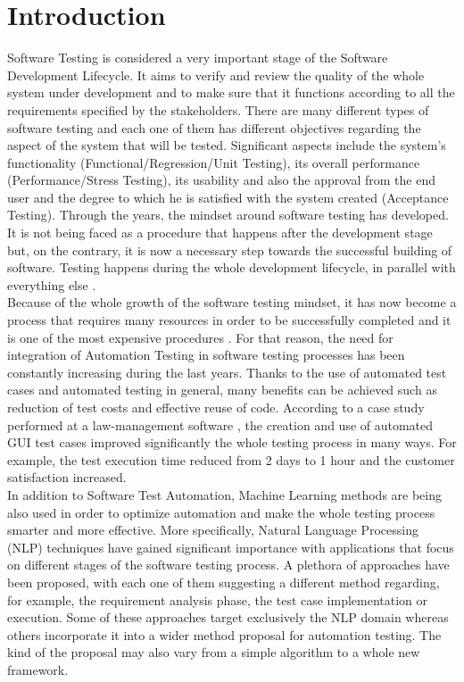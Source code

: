 \chapter{Introduction}

Software Testing is considered a very important stage of the Software Development Lifecycle. It aims to verify and review the quality of the whole system 
under development and to make sure that it functions according to all the requirements specified by the stakeholders. There are many different types of software testing and each 
one of them has different objectives regarding the aspect of the system that will be tested. Significant aspects include the system's functionality 
(Functional/Regression/Unit Testing), its overall performance (Performance/Stress Testing), its usability and also the approval from the end user and 
the degree to which he is satisfied with the system created (Acceptance Testing). Through the years, the mindset around software testing 
has developed. It is not being faced as a procedure that happens after the development stage but, on the contrary, it is now a necessary 
step towards the successful building of software. Testing happens during the whole development lifecycle, in parallel with everything else \cite{swebok}.  \\

Because of the whole growth of the software testing mindset, it has now become a process that requires many resources in order to be successfully
 completed and it is one of the most expensive procedures \cite{testautomation}. For that reason, the need for integration of Automation Testing in software testing
  processes has been constantly increasing during the last years. Thanks to the use of automated test cases and automated testing in general, many benefits can be achieved such 
  as reduction of test costs and effective reuse of code. According to a case study performed at a law-management software \cite{introautotesting}, the creation and
   use of automated GUI test cases improved significantly the whole testing process in many ways. For example, the test execution time reduced from 2 days to 1 hour and the 
   customer satisfaction increased. \\

In addition to Software Test Automation, Machine Learning methods are being also used in order to optimize automation and make the whole testing process smarter and more 
effective. More specifically, Natural Language Processing (NLP) techniques have gained significant importance with applications that focus on different stages of the software testing process. 
A plethora of approaches have been proposed, with each one of them suggesting a different method regarding, for example, the requirement analysis phase, the test case implementation or execution. 
Some of these approaches target exclusively the NLP domain whereas others incorporate it into a wider method proposal for automation testing. The kind of the proposal may also vary from a simple 
algorithm to a whole new framework. \\

